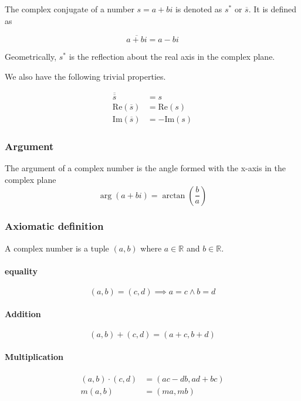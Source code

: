 \documentclass{article}
\begin{document}
The complex conjugate of a number \(s=a+bi\) is denoted as \(s^*\) or \(\overline{s}\).
It is defined as

\[
    \overline{a+bi} = a-bi
\]

Geometrically, \(s^*\) is the reflection about the real axis in the complex plane.

We also have the following trivial properties.

\begin{align*}
    \overline{\overline{s}} &= s
    \\
    \text{Re}(\overline{s}) &= \text{Re}(s)
    \\
    \text{Im}(\overline{s}) &= -\text{Im}(s)
\end{align*}

\subsubsection{Argument}

The argument of a complex number is the angle formed with the x-axis in
the complex plane
\[
    \arg(a+bi)=\arctan \left(\frac{b}{a}\right)
\]

\subsubsection{Axiomatic definition}

A complex number is a tuple \((a,b)\) where \(a\in \mathbb{R}\) and \(b\in \mathbb{R}\).

\paragraph{equality}
\[
    (a,b) = (c,d) \implies a=c \land b=d
\]

\paragraph{Addition}
\[
    (a,b) + (c,d) = (a+c, b+d)
\]

\paragraph{Multiplication}
\begin{align*}
    (a,b) \cdot (c,d) &= (ac-db, ad+bc)
    \\
    m(a,b) &= (ma, mb)
\end{align*}
\end{document}
